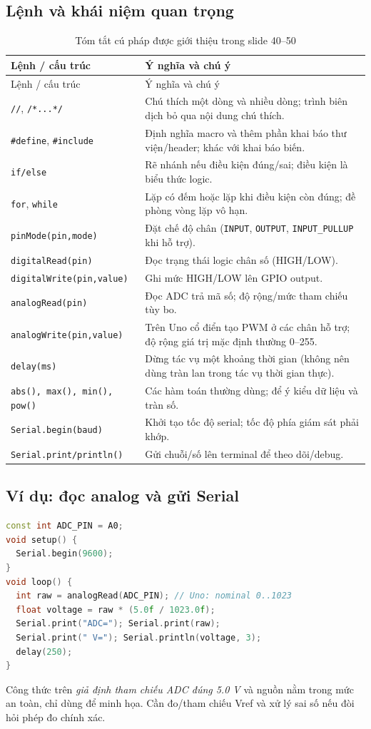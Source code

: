 \subsection{Lệnh và khái niệm quan trọng}
\begin{longtable}{p{43mm}p{93mm}}
\caption{Tóm tắt cú pháp được giới thiệu trong slide 40--50}\label{tab:arduino_api}\\
\toprule
Lệnh / cấu trúc & Ý nghĩa và chú ý\\\midrule\endfirsthead
\toprule Lệnh / cấu trúc & Ý nghĩa và chú ý\\\midrule\endhead
\texttt{//}, \texttt{/*...*/} & Chú thích một dòng và nhiều dòng; trình biên dịch bỏ qua nội dung chú thích.\\
\texttt{\#define}, \texttt{\#include} & Định nghĩa macro và thêm phần khai báo thư viện/header; khác với khai báo biến.\\
\texttt{if/else} & Rẽ nhánh nếu điều kiện đúng/sai; điều kiện là biểu thức logic.\\
\texttt{for}, \texttt{while} & Lặp có đếm hoặc lặp khi điều kiện còn đúng; đề phòng vòng lặp vô hạn.\\
\texttt{pinMode(pin,mode)} & Đặt chế độ chân (\texttt{INPUT}, \texttt{OUTPUT}, \texttt{INPUT\_PULLUP} khi hỗ trợ).\\
\texttt{digitalRead(pin)} & Đọc trạng thái logic chân số (HIGH/LOW).\\
\texttt{digitalWrite(pin,value)} & Ghi mức HIGH/LOW lên GPIO output.\\
\texttt{analogRead(pin)} & Đọc ADC trả mã số; độ rộng/mức tham chiếu tùy bo.\\
\texttt{analogWrite(pin,value)} & Trên Uno cổ điển tạo PWM ở các chân hỗ trợ; độ rộng giá trị mặc định thường 0--255.\\
\texttt{delay(ms)} & Dừng tác vụ một khoảng thời gian (không nên dùng tràn lan trong tác vụ thời gian thực).\\
\texttt{abs(), max(), min(), pow()} & Các hàm toán thường dùng; để ý kiểu dữ liệu và tràn số.\\
\texttt{Serial.begin(baud)} & Khởi tạo tốc độ serial; tốc độ phía giám sát phải khớp.\\
\texttt{Serial.print/println()} & Gửi chuỗi/số lên terminal để theo dõi/debug.\\\bottomrule
\end{longtable}

\subsection{Ví dụ: đọc analog và gửi Serial}
\begin{lstlisting}[language=C++,caption={Đọc ADC của Arduino Uno ATmega328P}]
const int ADC_PIN = A0;
void setup() {
  Serial.begin(9600);
}
void loop() {
  int raw = analogRead(ADC_PIN); // Uno: nominal 0..1023
  float voltage = raw * (5.0f / 1023.0f);
  Serial.print("ADC="); Serial.print(raw);
  Serial.print(" V="); Serial.println(voltage, 3);
  delay(250);
}
\end{lstlisting}
Công thức trên \emph{giả định tham chiếu ADC đúng 5.0 V} và nguồn nằm trong mức an toàn, chỉ dùng để minh họa. Cần đo/tham chiếu Vref và xử lý sai số nếu đòi hỏi phép đo chính xác.

